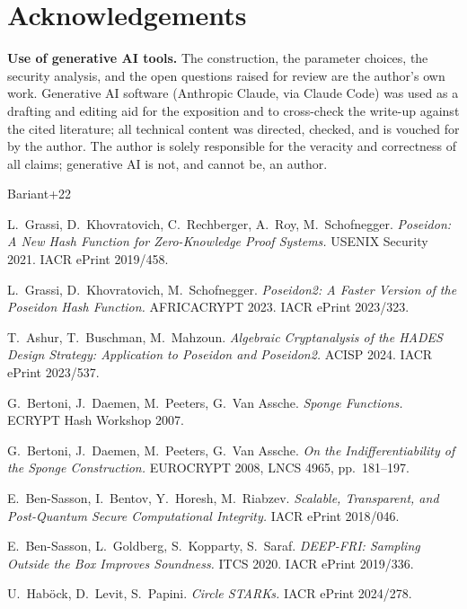 \documentclass[11pt]{article}
\theoremstyle{plain}
\theoremstyle{definition}
\begin{document}
\section*{Acknowledgements}

\textbf{Use of generative AI tools.} The construction, the parameter choices, the security analysis,
and the open questions raised for review are the author's own work. Generative AI software (Anthropic
Claude, via Claude Code) was used as a drafting and editing aid for the exposition and to cross-check
the write-up against the cited literature; all technical content was directed, checked, and is
vouched for by the author. The author is solely responsible for the veracity and correctness of all
claims; generative AI is not, and cannot be, an author.

\begin{thebibliography}{Bariant+22}

 L.~Grassi, D.~Khovratovich, C.~Rechberger, A.~Roy, M.~Schofnegger.
  \emph{Poseidon: A New Hash Function for Zero-Knowledge Proof Systems.} USENIX Security 2021. IACR
  ePrint 2019/458.

 L.~Grassi, D.~Khovratovich, M.~Schofnegger. \emph{Poseidon2: A Faster Version
  of the Poseidon Hash Function.} AFRICACRYPT 2023. IACR ePrint 2023/323.

 T.~Ashur, T.~Buschman, M.~Mahzoun. \emph{Algebraic Cryptanalysis of the HADES
  Design Strategy: Application to Poseidon and Poseidon2.} ACISP 2024. IACR ePrint 2023/537.

 G.~Bertoni, J.~Daemen, M.~Peeters, G.~Van Assche. \emph{Sponge Functions.}
  ECRYPT Hash Workshop 2007.

 G.~Bertoni, J.~Daemen, M.~Peeters, G.~Van Assche. \emph{On the
  Indifferentiability of the Sponge Construction.} EUROCRYPT 2008, LNCS 4965, pp.~181--197.

 E.~Ben-Sasson, I.~Bentov, Y.~Horesh, M.~Riabzev. \emph{Scalable,
  Transparent, and Post-Quantum Secure Computational Integrity.} IACR ePrint 2018/046.

 E.~Ben-Sasson, L.~Goldberg, S.~Kopparty, S.~Saraf. \emph{DEEP-FRI: Sampling
  Outside the Box Improves Soundness.} ITCS 2020. IACR ePrint 2019/336.

 U.~Hab\"ock, D.~Levit, S.~Papini. \emph{Circle STARKs.} IACR ePrint 2024/278.


\end{thebibliography}
\end{document}
